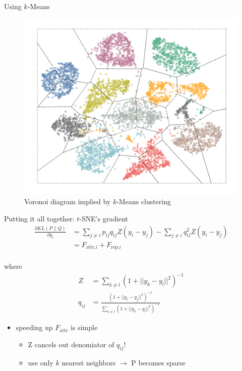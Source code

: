 \documentclass{beamer}
\begin{document}
\begin{frame}[fragile]{Using $k$-Means}
    \begin{figure}[h]
        \centering
        \includegraphics[width=.6\textwidth]{voronoi}
        \caption{Voronoi diagram implied by $k$-Means clustering}
    \end{figure}
\end{frame}

\begin{frame}[fragile]{Putting it all together: $t$-SNE's gradient}
    \begin{align*}
        \frac{\partial KL(P \; || \; Q)}{\partial y_i} &= \sum_{j \neq i} p_{ij}q_{ij}Z(y_i - y_j) - \sum_{j \neq i} q_{ij}^2Z(y_i - y_j) \\
        &= F_\text{attr,$i$} + F_\text{rep,$i$}\\
    \end{align*}

    \vspace{-2em}

    \quad where
    \begin{align*}
        Z &= \sum_{k \neq l} (1 + || y_k - y_l||^2)^{-1} \\
        q_{ij} &= \frac{(1 + ||y_i - y_j||^2)^{-1}}{\sum_{k \neq l} (1 + ||y_k - y_l||^2)^{-1}}
    \end{align*}

    \begin{itemize}
        \item speeding up $F_\text{attr}$ is simple
            \begin{itemize}
                \item \alert{Z cancels out denomiator of $q_{ij}$!}
                \item use only $k$ nearest neighbors $\rightarrow$ P becomes sparse
            \end{itemize}
    \end{itemize}
\end{frame}
\end{document}
